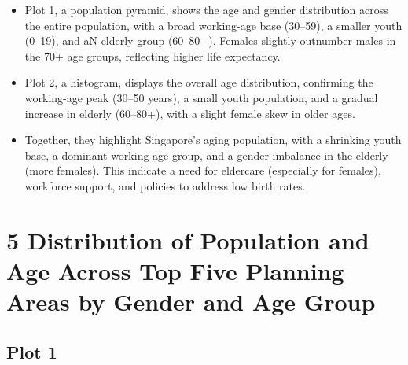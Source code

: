 \documentclass[
  letterpaper,
  DIV=11,
  numbers=noendperiod]{scrartcl}
\begin{document}
\begin{itemize}
\item
  Plot 1, a population pyramid, shows the age and gender distribution
  across the entire population, with a broad working-age base (30--59),
  a smaller youth (0--19), and aN elderly group (60--80+). Females
  slightly outnumber males in the 70+ age groups, reflecting higher life
  expectancy.
\item
  Plot 2, a histogram, displays the overall age distribution, confirming
  the working-age peak (30--50 years), a small youth population, and a
  gradual increase in elderly (60--80+), with a slight female skew in
  older ages.
\item
  Together, they highlight Singapore's aging population, with a
  shrinking youth base, a dominant working-age group, and a gender
  imbalance in the elderly (more females). This indicate a need for
  eldercare (especially for females), workforce support, and policies to
  address low birth rates.
\end{itemize}

\section{5 Distribution of Population and Age Across Top Five Planning
Areas by Gender and Age
Group}\label{distribution-of-population-and-age-across-top-five-planning-areas-by-gender-and-age-group}

\subsection{Plot 1}\label{plot-1-2}
\end{document}
